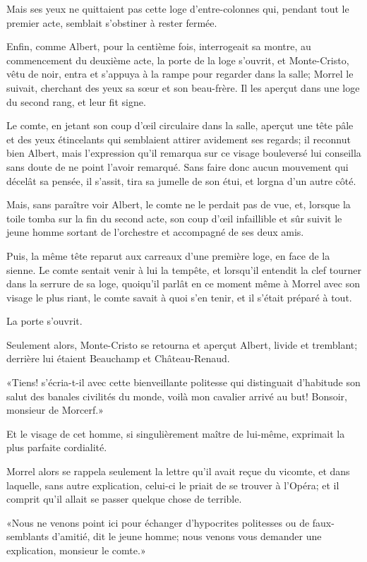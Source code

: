 Mais ses yeux ne quittaient pas cette loge d'entre-colonnes qui, pendant tout le premier acte, semblait s'obstiner à rester fermée. 

Enfin, comme Albert, pour la centième fois, interrogeait sa montre, au commencement du deuxième acte, la porte de la loge s'ouvrit, et Monte-Cristo, vêtu de noir, entra et s'appuya à la rampe pour regarder dans la salle; Morrel le suivait, cherchant des yeux sa sœur et son beau-frère. Il les aperçut dans une loge du second rang, et leur fit signe. 

Le comte, en jetant son coup d'œil circulaire dans la salle, aperçut une tête pâle et des yeux étincelants qui semblaient attirer avidement ses regards; il reconnut bien Albert, mais l'expression qu'il remarqua sur ce visage bouleversé lui conseilla sans doute de ne point l'avoir remarqué. Sans faire donc aucun mouvement qui décelât sa pensée, il s'assit, tira sa jumelle de son étui, et lorgna d'un autre côté. 

Mais, sans paraître voir Albert, le comte ne le perdait pas de vue, et, lorsque la toile tomba sur la fin du second acte, son coup d'œil infaillible et sûr suivit le jeune homme sortant de l'orchestre et accompagné de ses deux amis. 

Puis, la même tête reparut aux carreaux d'une première loge, en face de la sienne. Le comte sentait venir à lui la tempête, et lorsqu'il entendit la clef tourner dans la serrure de sa loge, quoiqu'il parlât en ce moment même à Morrel avec son visage le plus riant, le comte savait à quoi s'en tenir, et il s'était préparé à tout. 

La porte s'ouvrit. 

Seulement alors, Monte-Cristo se retourna et aperçut Albert, livide et tremblant; derrière lui étaient Beauchamp et Château-Renaud. 

«Tiens! s'écria-t-il avec cette bienveillante politesse qui distinguait d'habitude son salut des banales civilités du monde, voilà mon cavalier arrivé au but! Bonsoir, monsieur de Morcerf.» 

Et le visage de cet homme, si singulièrement maître de lui-même, exprimait la plus parfaite cordialité. 

Morrel alors se rappela seulement la lettre qu'il avait reçue du vicomte, et dans laquelle, sans autre explication, celui-ci le priait de se trouver à l'Opéra; et il comprit qu'il allait se passer quelque chose de terrible. 

«Nous ne venons point ici pour échanger d'hypocrites politesses ou de faux-semblants d'amitié, dit le jeune homme; nous venons vous demander une explication, monsieur le comte.» 


